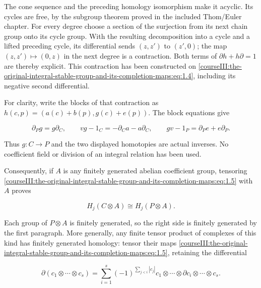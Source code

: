 The cone sequence and the preceding homology isomorphism make it acyclic. Its cycles are free, by the subgroup theorem proved in the included Thom/Euler chapter. For every degree choose a section of the surjection from its next chain group onto its cycle group. With the resulting decomposition into a cycle and a lifted preceding cycle, its differential sends \((z,z')\) to \((z',0)\); the map \((z,z')\mapsto(0,z)\) in the next degree is a contraction. Both terms of \(\partial h+h\partial=1\) are thereby explicit. This contraction has been constructed on \eqref{courseIII:the-original-integral-stable-group-and-its-completion-maps:eq:1.4}, including its negative second differential.

For clarity, write the blocks of that contraction as
\(h(c,p)=(a(c)+b(p),g(c)+e(p))\).
The block equations give

\begin{equation}
\partial_Pg=g\partial_C,\qquad
 vg-1_C=-\partial_Ca-a\partial_C,\qquad
 gv-1_P=\partial_Pe+e\partial_P.
 \label{courseIII:the-original-integral-stable-group-and-its-completion-maps:eq:1.5}
\end{equation}

Thus \(g:C\to P\) and the two displayed homotopies are actual inverses. No coefficient field or division of an integral relation has been used.

Consequently, if \(A\) is any finitely generated abelian coefficient group, tensoring \eqref{courseIII:the-original-integral-stable-group-and-its-completion-maps:eq:1.5} with \(A\) proves

\begin{equation}
H_j(C\otimes A)\cong H_j(P\otimes A).
 \label{courseIII:the-original-integral-stable-group-and-its-completion-maps:eq:1.6}
\end{equation}

Each group of \(P\otimes A\) is finitely generated, so the right side is finitely generated by the first paragraph. More generally, any finite tensor product of complexes of this kind has finitely generated homology: tensor their maps \eqref{courseIII:the-original-integral-stable-group-and-its-completion-maps:eq:1.5}, retaining the differential

\begin{equation}
\partial(c_1\otimes\cdots\otimes c_s)
 =\sum_{i=1}^s(-1)^{\sum_{j<i}|c_j|}
 c_1\otimes\cdots\otimes\partial c_i\otimes\cdots\otimes c_s.
 \label{courseIII:the-original-integral-stable-group-and-its-completion-maps:eq:1.7}
\end{equation}

